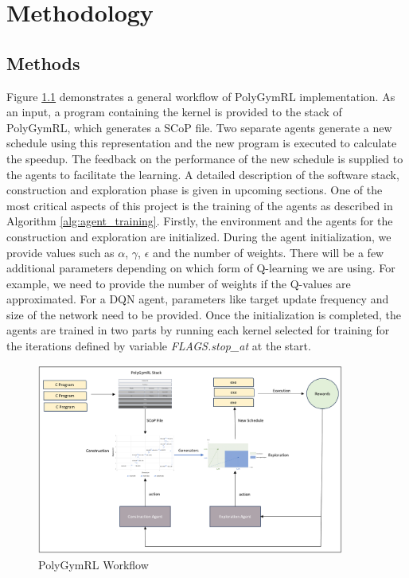 \documentclass[logo,msc]{infthesis}           %
\begin{document}
\chapter{Methodology}

\section{Methods}

Figure \ref{fig:PolyGymRL} demonstrates a general workflow of PolyGymRL implementation. As an input, a program containing the kernel is provided to the stack of PolyGymRL, which generates a SCoP file. Two separate agents generate a new schedule using this representation and the new program is executed to calculate the speedup. The feedback on the performance of the new schedule is supplied to the agents to facilitate the learning. A detailed description of the software stack, construction and exploration phase is given in upcoming sections. One of the most critical aspects of this project is the training of the agents as described in Algorithm \ref{alg:agent_training}. Firstly, the environment and the agents for the construction and exploration are initialized. During the agent initialization, we provide values such as $\alpha$, $\gamma$, $\epsilon$ and the number of weights. There will be a few additional parameters depending on which form of Q-learning we are using. For example, we need to provide the number of weights if the Q-values are approximated. For a DQN agent, parameters like target update frequency and size of the network need to be provided. Once the initialization is completed, the agents are trained in two parts by running each kernel selected for training for the iterations defined by variable \textit{FLAGS.stop\_at} at the start.

\begin{figure}[htbp]
  \centering
  \includegraphics[width=0.9\textwidth]{Images/PolyGymRL.png}    
  \caption{PolyGymRL Workflow}
  \label{fig:PolyGymRL}
\end{figure}
\end{document}
